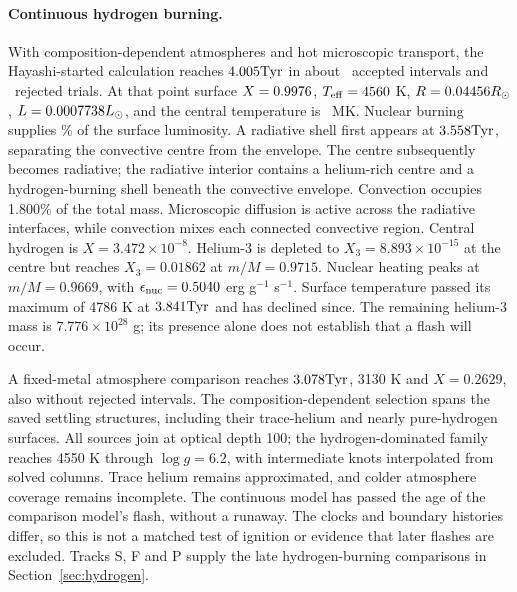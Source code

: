 \paragraph{Continuous hydrogen burning.}
With composition-dependent atmospheres and hot microscopic transport, the
Hayashi-started calculation reaches $4.005\mathrm{Tyr}$ in about
\continuousAccepted\ accepted intervals and \continuousRejected\ rejected
trials. At that point surface $X=0.9976$, $T_{\rm eff}=4560$ K,
$R=0.04456R_\odot$, $L=0.0007738L_\odot$, and the central
temperature is \continuousCoreTemperature\ MK. Nuclear burning supplies
\continuousNuclearPercent\% of the surface luminosity. A radiative shell
first appears at $3.558\mathrm{Tyr}$, separating the convective centre from the
envelope. The centre subsequently becomes radiative; the radiative interior
contains a helium-rich centre and a hydrogen-burning shell beneath the
convective envelope. Convection occupies 1.800\% of the total mass. Microscopic diffusion is active across the radiative
interfaces, while convection mixes each connected convective region.
Central hydrogen is $X=3.472\times10^{-8}$. Helium-3 is depleted to
$X_3=8.893\times10^{-15}$ at the centre but reaches $X_3=0.01862$ at
$m/M=0.9715$. Nuclear heating peaks at $m/M=0.9669$, with
$\epsilon_{\rm nuc}=0.5040$ erg g$^{-1}$ s$^{-1}$. Surface temperature
passed its maximum of 4786 K at $3.841\mathrm{Tyr}$ and has declined since.
The remaining helium-3 mass is $7.776\times10^{28}$ g; its presence alone
does not establish that a flash will occur.

A fixed-metal atmosphere comparison reaches $3.078\mathrm{Tyr}$, 3130 K and
$X=0.2629$, also without rejected intervals. The composition-dependent
selection spans the saved settling structures, including their trace-helium
and nearly pure-hydrogen surfaces. All sources join at optical depth 100;
the hydrogen-dominated family reaches 4550 K through $\log g=6.2$, with
intermediate knots interpolated from solved columns. Trace helium remains
approximated, and colder atmosphere coverage remains incomplete.
The continuous model has passed the age of the comparison model's flash,
without a runaway. The clocks and boundary histories differ, so this is
not a matched test of ignition or evidence that later flashes are excluded.
Tracks S, F and P supply the late hydrogen-burning comparisons in
Section~\ref{sec:hydrogen}.

